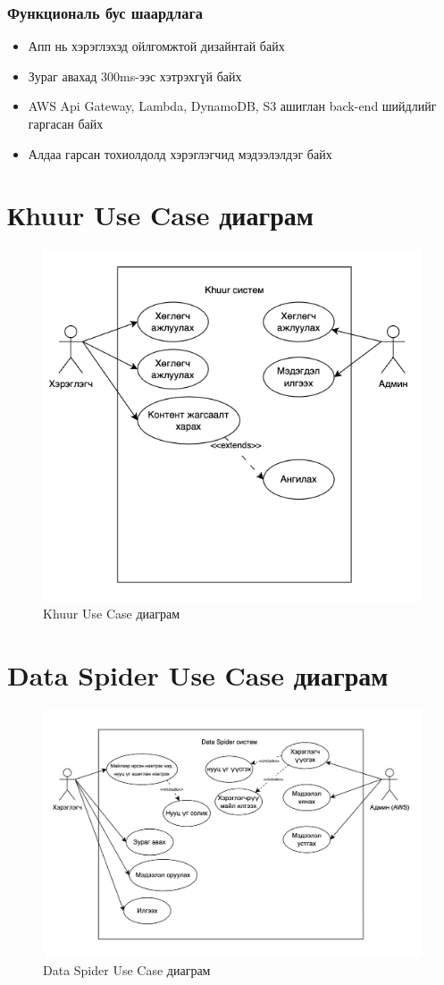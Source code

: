         \subsubsection{Функциональ бус шаардлага}
            \begin{itemize}
                \item Апп нь хэрэглэхэд ойлгомжтой дизайнтай байх
                \item Зураг авахад 300ms-ээс хэтрэхгүй байх
                \item AWS Api Gateway, Lambda, DynamoDB, S3 ашиглан back-end шийдлийг гаргасан байх
                \item Алдаа гарсан тохиолдолд хэрэглэгчид мэдээлэлдэг байх
            \end{itemize}
\pagebreak
\section{Кhuur Use Case диаграм}
\begin{figure}[h]
	\centering
	\includegraphics[width=13cm]{images/khuur-usecase.png}
	\caption{Khuur Use Case диаграм}
	\label{fig:form}
\end{figure}
\section{Data Spider Use Case диаграм}
\begin{figure}[h]
	\centering
	\includegraphics[width=13cm]{images/dataspider-usecase.png}
	\caption{Data Spider Use Case диаграм}
	\label{fig:form}
\end{figure}
